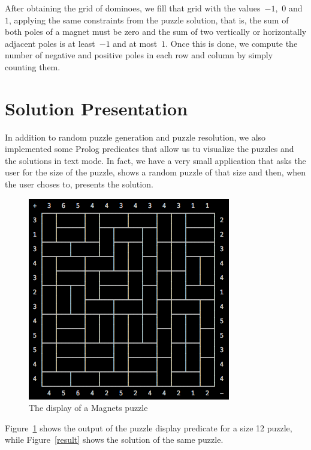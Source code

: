\documentclass{llncs}
\begin{document}
After obtaining the grid of dominoes, we fill that grid with the values~$-1$,~$0$ and~$1$, applying the same constraints from the puzzle solution, that is, the sum of both poles of a magnet must be zero and the sum of two vertically or horizontally adjacent poles is at least~$-1$ and at most~$1$. Once this is done, we compute the number of negative and positive poles in each row and column by simply counting them.


\section{Solution Presentation} 

In addition to random puzzle generation and puzzle resolution, we also implemented some Prolog predicates that allow us tu visualize the puzzles and the solutions in text mode. In fact, we have a very small application that asks the user for the size of the puzzle, shows a random puzzle of that size and then, when the user choses to, presents the solution. 

\begin{figure}[htbp]
\begin{center}
\includegraphics[scale=0.6]{puzzle.png}
\caption{The display of a Magnets puzzle}
\label{puzzle}
\end{center}
\end{figure}

Figure~\ref{puzzle} shows the output of the puzzle display predicate for a size 12 puzzle, while Figure~\ref{result} shows the solution of the same puzzle.
 
\end{document}
